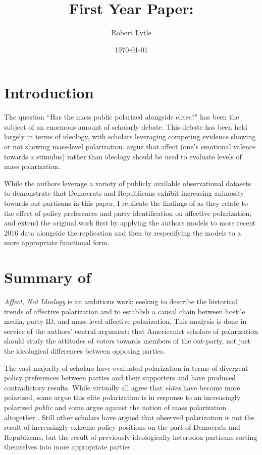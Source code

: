 \documentclass[12pt]{article}
\begin{document}
\title{First Year Paper:\\ \large{\citet{iyengar2012affect}}}
\author{Robert Lytle}
\date{\today}
\maketitle
\thispagestyle{empty}
\clearpage
\section{Introduction}
The question ``Has the mass public polarized alongside elites?" has been the subject of an enormous amount of scholarly debate. This debate has been held largely in terms of ideology, with scholars leveraging competing evidence showing \citep{abramowitz2010disappearing} or not showing \citep{fiorina2012disconnect} mass-level polarization. \cite{iyengar2012affect} argue that affect (one's emotional valence towards a stimulus) rather than ideology should be used to evaluate levels of mass polarization. 

While the authors leverage a variety of publicly available observational datasets to demonstrate that Democrats and Republicans exhibit increasing animosity towards out-partisans in this paper, I replicate the findings of \cite{iyengar2012affect} as they relate to the effect of policy preferences and party identification on affective polarization, and extend the original work first by applying the authors models to more recent 2016 data alongside the replication and then by respecifying the models to a more appropriate functional form.


\section{Summary of \cite{iyengar2012affect}}
\textit{Affect, Not Ideology} is an ambitious work; seeking to describe the historical trends of affective polarization and to establish a causal chain between hostile media, party-ID, and mass-level affective polarization. This analysis is done in service of the authors' central argument: that Americanist scholars of polarization should study the attitudes of voters towards members of the out-party, not just the ideological differences between opposing parties.

The vast majority of scholars have evaluated polarization in terms of divergent policy preferences between parties and their supporters and have produced contradictory results. While virtually all agree that \textit{elites} have become more polarized, some argue this elite polarization is in response to an increasingly polarized \textit{public} \citep{abramowitz2010disappearing} and some argue against the notion of mass polarization altogether \citep{fiorina2012disconnect, fiorina2005culture}. Still other scholars have argued that observed polarization is not the result of increasingly extreme policy positions on the part of Democrats and Republicans, but the result of previously ideologically heterodox partisans sorting themselves into more appropriate parties \citep{levendusky2009partisan}.
\end{document}

